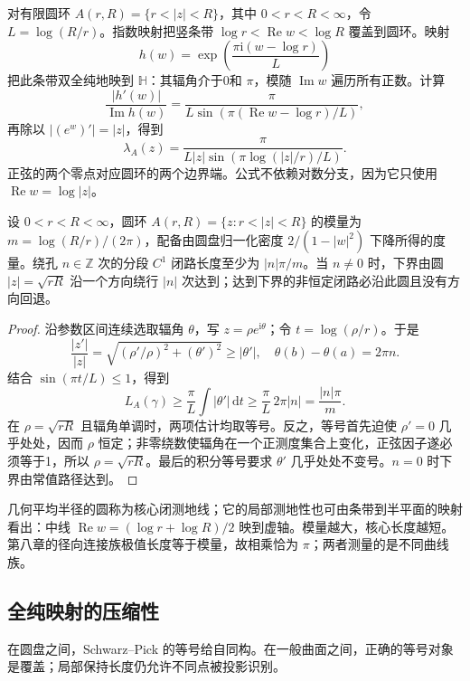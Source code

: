 \ProseParagraphBreak
对有限圆环 \(A(r,R)=\{r<|z|<R\}\)，其中 \(0<r<R<\infty\)，令 \(L=\log(R/r)\)。指数映射把竖条带 \(\log r<\operatorname{Re}w<\log R\) 覆盖到圆环。映射
\[
 h(w)=\exp\left(\frac{\pi\mathrm i(w-\log r)}L\right)
\]
把此条带双全纯地映到 \(\mathbb H\)：其辐角介于0和 \(\pi\)，模随 \(\operatorname{Im}w\) 遍历所有正数。计算
\[
 \frac{|h'(w)|}{\operatorname{Im}h(w)}
 =\frac{\pi}{L\sin(\pi(\operatorname{Re}w-\log r)/L)},
\]
再除以 \(|(e^w)'|=|z|\)，得到
\[
 \lambda_A(z)=
 \frac{\pi}{L|z|\sin(\pi\log(|z|/r)/L)}.
\]
正弦的两个零点对应圆环的两个边界端。公式不依赖对数分支，因为它只使用 \(\operatorname{Re}w=\log|z|\)。

\begin{proposition}[圆环的最短核心曲线]\label{b3:prop:13-annulus-core}
设 \(0<r<R<\infty\)，圆环 \(A(r,R)=\{z:r<|z|<R\}\) 的模量为 \(m=\log(R/r)/(2\pi)\)，配备由圆盘归一化密度 \(2/(1-|w|^2)\) 下降所得的度量。绕孔 \(n\in\mathbb Z\) 次的分段 \(C^1\) 闭路长度至少为 \(|n|\pi/m\)。当 \(n\ne0\) 时，下界由圆 \(|z|=\sqrt{rR}\) 沿一个方向绕行 \(|n|\) 次达到；达到下界的非恒定闭路必沿此圆且没有方向回退。
\end{proposition}
\begin{proof}
沿参数区间连续选取辐角 \(\theta\)，写 \(z=\rho e^{\mathrm i\theta}\)；令 \(t=\log(\rho/r)\)。于是
\[
 \frac{|z'|}{|z|}=\sqrt{(\rho'/\rho)^2+(\theta')^2}
 \ge |\theta'|,\quad \theta(b)-\theta(a)=2\pi n.
\]
结合 \(\sin(\pi t/L)\le1\)，得到
\[
 L_A(\gamma)\ge\frac\pi L\int|\theta'|\,\mathrm dt
 \ge\frac\pi L\,2\pi|n|=\frac{|n|\pi}m.
\]
在 \(\rho=\sqrt{rR}\) 且辐角单调时，两项估计均取等号。反之，等号首先迫使 \(\rho'=0\) 几乎处处，因而 \(\rho\) 恒定；非零绕数使辐角在一个正测度集合上变化，正弦因子遂必须等于1，所以 \(\rho=\sqrt{rR}\)。最后的积分等号要求 \(\theta'\) 几乎处处不变号。\(n=0\) 时下界由常值路径达到。
\end{proof}
几何平均半径的圆称为核心闭测地线；它的局部测地性也可由条带到半平面的映射看出：中线 \(\operatorname{Re}w=(\log r+\log R)/2\) 映到虚轴。模量越大，核心长度越短。第八章的径向连接族极值长度等于模量，故相乘恰为 \(\pi\)；两者测量的是不同曲线族。

\subsection{全纯映射的压缩性}
\label{b3:subsec:130403}

在圆盘之间，Schwarz--Pick 的等号给自同构。在一般曲面之间，正确的等号对象是覆盖；局部保持长度仍允许不同点被投影识别。

